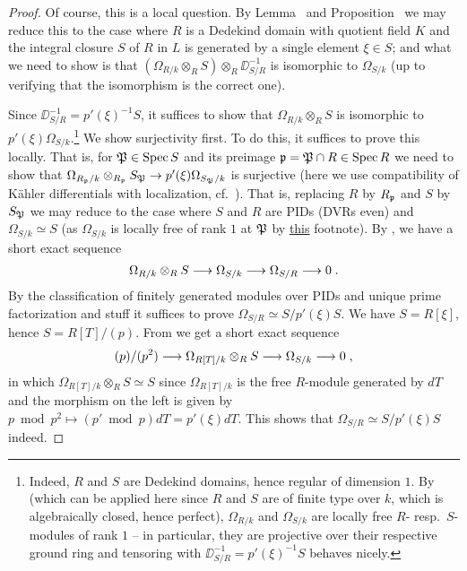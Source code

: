 \documentclass[a4paper,parskip=half,numbers=enddot, DIV=12]{scrreprt}
\begin{document}
\begin{proof}
	Of course, this is a local question. By Lemma~ and Proposition~ we may reduce this to the case where $R$ is a Dedekind domain with quotient field $K$ and the integral closure $S$ of $R$ in $L$ is generated by a single element $\xi\in S$; and what we need to show is that $(\Omega_{R/k}\otimes_RS)\otimes_R\DD_{S/R}^{-1}$ is isomorphic to $\Omega_{S/k}$ (up to verifying that the isomorphism is the correct one).
	
	Since $\DD_{S/R}^{-1}=p'(\xi)^{-1}S$, it suffices to show that $\Omega_{R/k}\otimes_RS$ is isomorphic to $p'(\xi)\Omega_{S/k}$.\footnote{Indeed, $R$ and $S$ are Dedekind domains, hence regular of dimension $1$. By \cite[Proposition~1.6.3]{alg2} (which can be applied here since $R$ and $S$ are of finite type over $k$, which is algebraically closed, hence perfect), $\Omega_{R/k}$ and $\Omega_{S/k}$ are locally free $R$- resp.\ $S$-modules of rank $1$ -- in particular, they are projective over their respective ground ring and tensoring with $\DD_{S/R}^{-1}=p'(\xi)^{-1}S$ behaves nicely.} We show surjectivity first. To do this, it suffices to prove this locally. That is, for $\mathfrak{P}\in\operatorname{Spec} S$ and its preimage $\mathfrak{p}=\mathfrak{P}\cap R\in\operatorname{Spec} R$ we need to show that $\Omega_{R_\pp/k}\otimes_{R_\pp}S_\PP\morphism p'(\xi)\Omega_{S_\PP/k}$ is surjective (here we use compatibility of Kähler differentials with localization, cf.\ \cite[Corollary~1.4.1a]{alg2}). That is, replacing $R$ by $R_{\mathfrak{p}}$ and $S$ by $S_{\mathfrak{P}}$ we may reduce to the case where $S$ and $R$ are PIDs (DVRs even) and $\Omega_{S/k}\simeq S$ (as $\Omega_{S/k}$ is locally free of rank $1$ at $\mathfrak{P}$ by \hyperref[footnote:OmegaLocFree]{this} footnote). By \cite[Corollary~1.4.1]{alg2}, we have a short exact sequence
	\begin{align*}
		\Omega_{R/k}\otimes_RS\morphism\Omega_{S/k}\morphism\Omega_{S/R}\morphism 0\;.
	\end{align*}
	By the classification of finitely generated modules over PIDs and unique prime factorization and stuff it suffices to prove $\Omega_{S/R}\simeq S/p'(\xi)S$. We have $S=R[\xi]$, hence $S=R[T]/(p)$. From \cite[Corollary~1.4.1]{alg2} we get a short exact sequence
	\begin{align*}
		(p)/(p^2)\morphism\Omega_{R[T]/k}\otimes_RS\morphism\Omega_{S/k}\morphism 0\;,
	\end{align*}
	in which $\Omega_{R[T]/k}\otimes_RS\simeq S$ since $\Omega_{R[T]/k}$ is the free $R$-module generated by $dT$ and the morphism on the left is given by $p\bmod p^2\mapsto (p'\bmod p)dT=p'(\xi)dT$. This shows that $\Omega_{S/R}\simeq S/p'(\xi)S$ indeed.
	

\end{proof}
\end{document}
